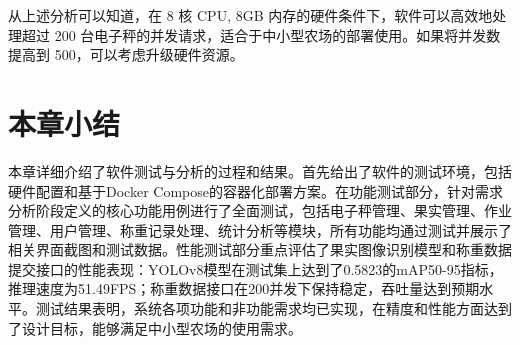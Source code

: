 从上述分析可以知道，在 8 核 CPU, 8GB 内存的硬件条件下，软件可以高效地处理超过 200 台电子秤的并发请求，适合于中小型农场的部署使用。如果将并发数提高到 500，可以考虑升级硬件资源。

\section{本章小结}

本章详细介绍了软件测试与分析的过程和结果。首先给出了软件的测试环境，包括硬件配置和基于Docker Compose的容器化部署方案。在功能测试部分，针对需求分析阶段定义的核心功能用例进行了全面测试，包括电子秤管理、果实管理、作业管理、用户管理、称重记录处理、统计分析等模块，所有功能均通过测试并展示了相关界面截图和测试数据。性能测试部分重点评估了果实图像识别模型和称重数据提交接口的性能表现：YOLOv8模型在测试集上达到了0.5823的mAP50-95指标，推理速度为51.49FPS；称重数据接口在200并发下保持稳定，吞吐量达到预期水平。测试结果表明，系统各项功能和非功能需求均已实现，在精度和性能方面达到了设计目标，能够满足中小型农场的使用需求。
